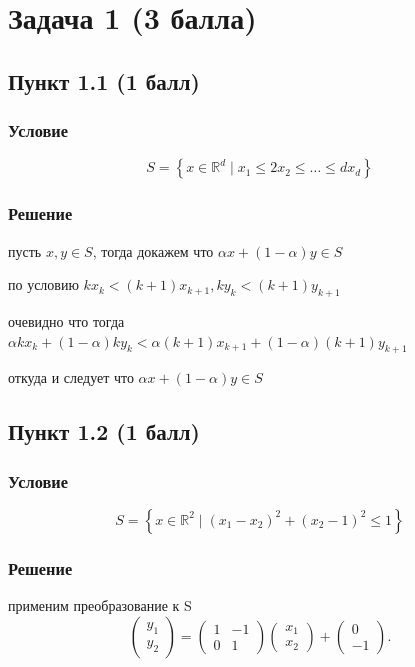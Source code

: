 \documentclass[10pt]{article}
\begin{document}
\section{Задача 1 (3 балла)}

\subsection{Пункт 1.1 (1 балл)}
\subsubsection{Условие}

\[
S=\left\{x \in \mathbb{R}^{d} \mid x_{1} \leq 2 x_{2} \leq \ldots \leq d x_{d}\right\}
\]

\vspace{5mm}
\subsubsection{Решение}

пусть $x, y \in S$, тогда докажем что $\alpha x + (1-\alpha)y \in S$

по условию $kx_k < (k+1)x_{k+1}, ky_k < (k+1)y_{k+1}$

очевидно что тогда $\alpha kx_k + (1-\alpha)ky_k < \alpha (k+1)x_{k+1} + (1-\alpha) (k+1)y_{k+1}$

откуда и следует что $\alpha x + (1-\alpha)y \in S$

\subsection{Пункт 1.2 (1 балл)}
\subsubsection{Условие}

\[
S=\left\{x \in \mathbb{R}^{2} \mid\left(x_{1}-x_{2}\right)^{2}+\left(x_{2}-1\right)^{2} \leq 1\right\}
\]

\subsubsection{Решение}

применим преобразование к S
\[
\begin{pmatrix} y_1 \\ y_2 \end{pmatrix} = 
\begin{pmatrix} 1 & -1 \\ 0 & 1 \end{pmatrix}
\begin{pmatrix} x_1 \\ x_2 \end{pmatrix} + 
\begin{pmatrix} 0 \\ -1 \end{pmatrix}.
\]
\end{document}
